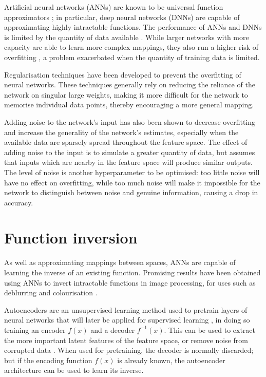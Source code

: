\documentclass[../../main.tex]{subfiles}
\begin{document}
Artificial neural networks (ANNs) are known to be universal function approximators \cite{hornik91}; in particular, deep neural networks (DNNs) \cite{liang17} are capable of approximating highly intractable functions.
The performance of ANNs and DNNs is limited by the quantity of data available \cite{raudys91}.
While larger networks with more capacity are able to learn more complex mappings, they also run a higher risk of overfitting \cite{caruana01}, a problem exacerbated when the quantity of training data is limited.

Regularisation techniques have been developed \cite{goodfellow16, srivastava14, ioffe15, li18} to prevent the overfitting of neural networks.
These techniques generally rely on reducing the reliance of the network on singular large weights, making it more difficult for the network to memorise individual data points, thereby encouraging a more general mapping.

Adding noise to the network's input \cite{zur09} has also been shown to decrease overfitting and increase the generality of the network's estimates, especially when the available data are sparsely spread throughout the feature space.
The effect of adding noise to the input is to simulate a greater quantity of data, but assumes that inputs which are nearby in the feature space will produce similar outputs.
The level of noise is another hyperparameter to be optimised: too little noise will have no effect on overfitting, while too much noise will make it impossible for the network to distinguish between noise and genuine information, causing a drop in accuracy.

\section{Function inversion} \label{section:functionInversion}

As well as approximating mappings between spaces, ANNs are capable of learning the inverse of an existing function.
Promising results have been obtained using ANNs to invert intractable functions in image processing, for uses such as deblurring \cite{nah18} and colourisation \cite{nguyen16}.

Autoencoders are an unsupervised learning method used to pretrain layers of neural networks that will later be applied for supervised learning \cite{rumelhart86}, in doing so training an encoder $f(x)$ and a decoder $f^{-1}(x)$.
This can be used to extract the more important latent features of the feature space, or remove noise from corrupted data \cite{vincent08}.
When used for pretraining, the decoder is normally discarded; but if the encoding function $f(x)$ is already known, the autoencoder architecture can be used to learn its inverse.
\end{document}
